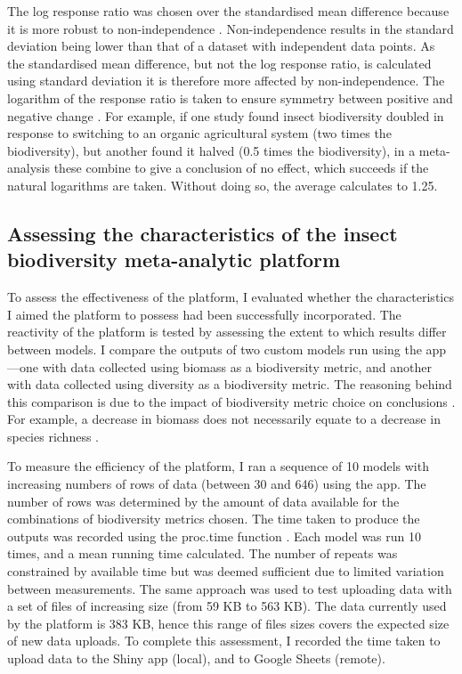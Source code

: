 \documentclass[11pt]{article}
\begin{document}
		\noindent The log response ratio was chosen over the standardised mean difference because it is more robust to non-independence \citep{noble2017nonindependence}. Non-independence results in the standard deviation being lower than that of a dataset with independent data points. As the standardised mean difference, but not the log response ratio, is calculated using standard deviation it is therefore more affected by non-independence. The logarithm of the response ratio is taken to ensure symmetry between positive and negative change \citep{hedges1999meta}. For example, if one study found insect biodiversity doubled in response to switching to an organic agricultural system (two times the biodiversity), but another found it halved (0.5 times the biodiversity), in a meta-analysis these combine to give a conclusion of no effect, which succeeds if the natural logarithms are taken. Without doing so, the average calculates to 1.25. 
		
		\subsection{Assessing the characteristics of the insect biodiversity meta-analytic platform }
		To assess the effectiveness of the platform, I evaluated whether the characteristics I aimed the platform to possess had been successfully incorporated. The reactivity of the platform is tested by assessing the extent to which results differ between models. I compare the outputs of two custom models run using the app—one with data collected using biomass as a biodiversity metric, and another with data collected using diversity as a biodiversity metric. The reasoning behind this comparison is due to the impact of biodiversity metric choice on conclusions \citep{hillebrand2018biodiversity}. For example, a decrease in biomass does not necessarily equate to a decrease in species richness \citep{jahnig2021revisiting}. 
		
		\noindent To measure the efficiency of the platform, I ran a sequence of 10 models with increasing numbers of rows of data (between 30 and 646) using the app. The number of rows was determined by the amount of data available for the combinations of biodiversity metrics chosen. The time taken to produce the outputs was recorded using the proc.time function \citep{team2013r}. Each model was run 10 times, and a mean running time calculated. The number of repeats was constrained by available time but was deemed sufficient due to limited variation between measurements. The same approach was used to test uploading data with a set of files of increasing size (from 59 KB to 563 KB). The data currently used by the platform is 383 KB, hence this range of files sizes covers the expected size of new data uploads. To complete this assessment, I recorded the time taken to upload data to the Shiny app (local), and to Google Sheets (remote). 
		
\end{document}
